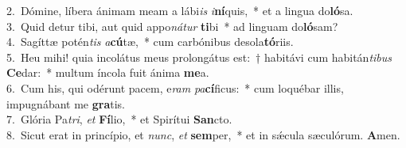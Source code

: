 {2.~}Dómine, líbera ánimam meam a lábi\textit{is} \textit{i}\textbf{ní}quis,~* et a lingua do\textbf{ló}sa.\\
{3.~}Quid detur tibi, aut quid appo\textit{ná}\textit{tur} \textbf{ti}bi~* ad linguam do\textbf{ló}sam?\\
{4.~}Sagíttæ potén\textit{tis} \textit{a}\textbf{cú}tæ,~* cum carbónibus desola\textbf{tó}riis.\\
{5.~}Heu mihi! quia incolátus meus prolongátus est:~† habitávi cum habitán\textit{ti}\textit{bus} \textbf{Ce}dar:~* multum íncola fuit ánima \textbf{me}a.\\
{6.~}Cum his, qui odérunt pacem, e\textit{ram} \textit{pa}\textbf{cí}ficus:~* cum loquébar illis, impugnábant me \textbf{gra}tis.\\
{7.~}Glória Pa\textit{tri}, \textit{et} \textbf{Fí}lio,~* et Spirítui \textbf{San}cto.\\
{8.~}Sicut erat in princípio, et \textit{nunc}, \textit{et} \textbf{sem}per,~* et in sǽcula sæculórum. \textbf{A}men.\\
